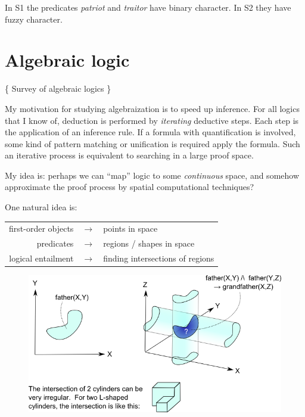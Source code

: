 In S1 the predicates \textit{patriot} and \textit{traitor} have binary character.  In S2 they have fuzzy character.

\underconst

\section{Algebraic logic}

\{ Survey of algebraic logics \}

My motivation for studying algebraization is to speed up inference.  For all logics that I know of, deduction is performed by \textit{iterating} deductive steps.  Each step is the application of an inference rule.  If a formula with quantification is involved, some kind of pattern matching or unification is required apply the formula.  Such an iterative process is equivalent to searching in a large proof space.

My idea is:  perhaps we can ``map'' logic to some \textit{continuous} space, and somehow approximate the proof process by spatial computational techniques?

One natural idea is:\\
\tab \begin{tabular}{rll}
first-order objects & $\longrightarrow$ & points in space\\
predicates          & $\longrightarrow$ & regions / shapes in space\\
logical entailment  & $\longrightarrow$ & finding intersections of regions\\
\end{tabular}

\begin{figure}[H]
\centering
\includegraphics[scale=1.0]{cylindrical-logic.png}
\end{figure}

